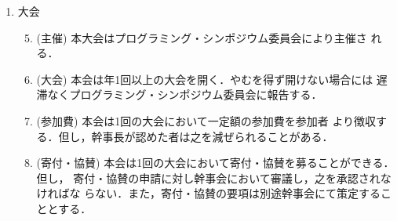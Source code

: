 \begin{enumerate}
\begin{enumerate}
\end{enumerate}
\newpage
\item	大会\\
%
\begin{enumerate}
\setcounter{enumii}{4}
\item	(主催) 本大会はプログラミング・シンポジウム委員会により主催さ
れる．\\
%
\item	(大会) 本会は年1回以上の大会を開く．やむを得ず開けない場合には
遅滞なくプログラミング・シンポジウム委員会に報告する．\\
%
\item (参加費) 本会は1回の大会において一定額の参加費を参加者
より徴収する．但し，幹事長が認めた者は之を減ぜられることがある．\\
%
\item (寄付・協賛) 本会は1回の大会において寄付・協賛を募ることができる．但し，
寄付・協賛の申請に対し幹事会において審議し，之を承認されなければな
らない．また，寄付・協賛の要項は別途幹事会にて策定することとする．\\
%
\end{enumerate}


\end{enumerate}
